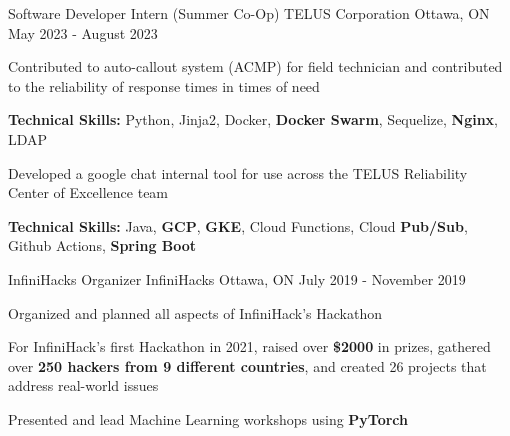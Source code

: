 

\begin{cventries}

  \cventry
    {Software Developer Intern (Summer Co-Op)} %
    {TELUS Corporation} %
    {Ottawa, ON} %
    {May 2023 - August 2023} %
    {
      \begin{cvitems} %
        \item {Contributed to auto-callout system (ACMP) for field technician and contributed to the reliability of response times in times of need}
          \item[] {\textbf{Technical Skills:} Python, Jinja2, Docker, \textbf{Docker Swarm}, Sequelize, \textbf{Nginx}, LDAP}
        \item {Developed a google chat internal tool for use across the TELUS Reliability Center of Excellence team}
          \item[] {\textbf{Technical Skills:} Java, \textbf{GCP}, \textbf{GKE}, Cloud Functions, Cloud \textbf{Pub/Sub}, Github Actions, \textbf{Spring Boot}}
      \end{cvitems}
    }

  \cventry
    {InfiniHacks Organizer} %
    {InfiniHacks} %
    {Ottawa, ON} %
    {July 2019 - November 2019} %
    {
      \begin{cvitems} %
        \item {Organized and planned all aspects of InfiniHack's Hackathon}
        \item {For InfiniHack's first Hackathon in 2021, raised over \textbf{\$2000} in prizes, gathered over \textbf{250 hackers from 9 different countries}, and created 26 projects that address real-world issues}
        \item {Presented and lead Machine Learning workshops using \textbf{PyTorch}}
      \end{cvitems}
    }


\end{cventries}

